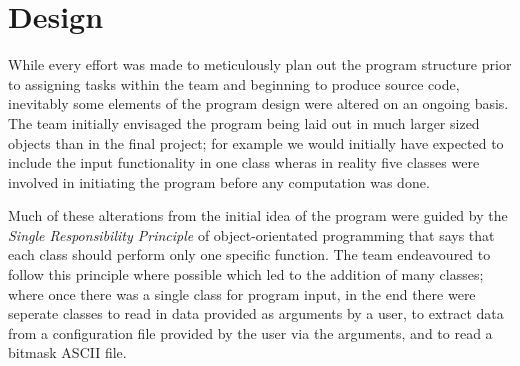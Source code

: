 \section{Design}
\label{Design}
While every effort was made to meticulously plan out the program structure prior to assigning tasks within the team and beginning to produce source code, inevitably some elements of the program design were altered on an ongoing basis. The team initially envisaged the program being laid out in much larger sized objects than in the final project; for example we would initially have expected to include the input functionality in one class wheras in reality five classes were involved in initiating the program before any computation was done. 

Much of these alterations from the initial idea of the program were guided by the \textit{Single Responsibility Principle} of object-orientated programming that says that each class should perform only one specific function. The team endeavoured to follow this principle where possible which led to the addition of many classes; where once there was a single class for program input, in the end there were seperate classes to read in data provided as arguments by a user, to extract data from a configuration file provided by the user via the arguments, and to read a bitmask ASCII file.
